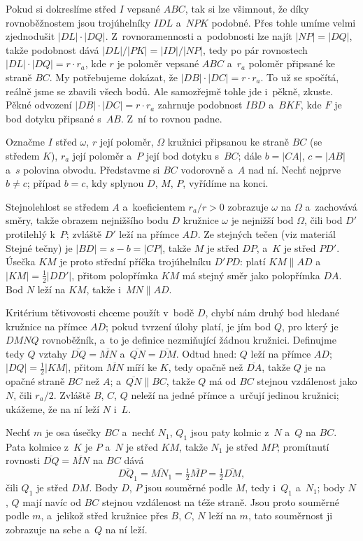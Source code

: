 {}{
    Pokud si dokreslíme střed $I$ vepsané $ABC$, tak si lze všimnout, že díky rovnoběžnostem jsou trojúhelníky $IDL$ a~$NPK$ podobné. Přes tohle umíme velmi zjednodušit $|DL| \cdot |DQ|$.
}{
    Z~rovnoramennosti a~podobnosti lze najít $|NP|=|DQ|$, takže podobnost dává $|DL|/|PK|=|ID|/|NP|$, tedy po pár rovnostech $|DL| \cdot |DQ| = r \cdot r_a$, kde $r$ je poloměr vepsané $ABC$ a~$r_a$ poloměr připsané ke straně $BC$. My potřebujeme dokázat, že $|DB| \cdot |DC| = r \cdot r_a$. To už se spočítá, reálně jsme se zbavili všech bodů. Ale samozřejmě tohle jde i~pěkně, zkuste.
}{
    Pěkné odvození $|DB| \cdot |DC| = r \cdot r_a$ zahrnuje podobnost $IBD$ a~$BKF$, kde $F$ je bod dotyku připsané s~$AB$. Z~ní to rovnou padne.
}{
    Označme $I$ střed $\omega$, $r$ její poloměr, $\Omega$ kružnici připsanou ke straně $BC$ (se středem $K$), $r_a$ její poloměr a~$P$ její bod dotyku s~$BC$; dále $b=|CA|$, $c=|AB|$ a~$s$ polovina obvodu. Představme si $BC$ vodorovně a~$A$ nad ní. Nechť nejprve $b \neq c$; případ $b=c$, kdy splynou $D$, $M$, $P$, vyřídíme na konci.

    Stejnolehlost se středem $A$ a~koeficientem $r_a/r > 0$ zobrazuje $\omega$ na $\Omega$ a~zachovává směry, takže obrazem nejnižšího bodu $D$ kružnice $\omega$ je nejnižší bod $\Omega$, čili bod $D'$ protilehlý k~$P$; zvláště $D'$ leží na přímce $AD$. Ze stejných tečen (viz materiál Stejné tečny) je $|BD| = s-b = |CP|$, takže $M$ je střed $DP$, a~$K$ je střed $PD'$. Úsečka $KM$ je proto střední příčka trojúhelníku $D'PD$: platí $KM \parallel AD$ a~$|KM| = \tfrac12|DD'|$, přitom polopřímka $KM$ má stejný směr jako polopřímka $DA$. Bod $N$ leží na $KM$, takže i~$MN \parallel AD$.

    Kritérium tětivovosti chceme použít v~bodě $D$, chybí nám druhý bod hledané kružnice na přímce $AD$; pokud tvrzení úlohy platí, je jím bod $Q$, pro který je $DMNQ$ rovnoběžník, a~to je definice nezmiňující žádnou kružnici. Definujme tedy $Q$ vztahy $\overline{DQ} = \overline{MN}$ a~$\overline{QN} = \overline{DM}$. Odtud hned: $Q$ leží na přímce $AD$; $|DQ| = \tfrac12|KM|$, přitom $\overline{MN}$ míří ke $K$, tedy opačně než $\overline{DA}$, takže $Q$ je na opačné straně $BC$ než $A$; a~$\overline{QN} \parallel BC$, takže $Q$ má od $BC$ stejnou vzdálenost jako $N$, čili $r_a/2$. Zvláště $B$, $C$, $Q$ neleží na jedné přímce a~určují jedinou kružnici; ukážeme, že na ní leží $N$ i~$L$.

    Nechť $m$ je osa úsečky $BC$ a~nechť $N_1$, $Q_1$ jsou paty kolmic z~$N$ a~$Q$ na $BC$. Pata kolmice z~$K$ je $P$ a~$N$ je střed $KM$, takže $N_1$ je střed $MP$; promítnutí rovnosti $\overline{DQ} = \overline{MN}$ na $BC$ dává
    $$
    \overline{DQ_1} = \overline{MN_1} = \tfrac12 \overline{MP} = \tfrac12 \overline{DM},
    $$
    čili $Q_1$ je střed $DM$. Body $D$, $P$ jsou souměrné podle $M$, tedy i~$Q_1$ a~$N_1$; body $N$, $Q$ mají navíc od $BC$ stejnou vzdálenost na téže straně. Jsou proto souměrné podle $m$, a~jelikož střed kružnice přes $B$, $C$, $N$ leží na $m$, tato souměrnost ji zobrazuje na sebe a~$Q$ na ní leží.

}
